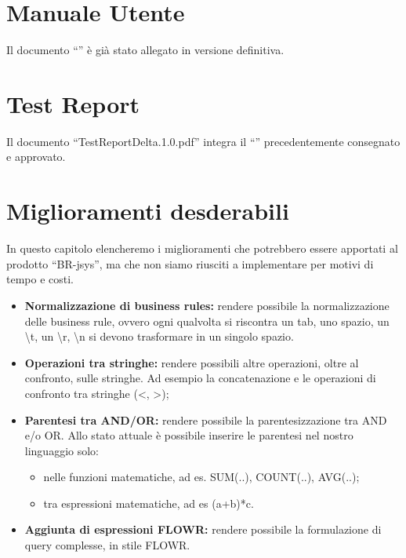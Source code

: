\chapter{Manuale Utente}
Il documento ``\MU'' \`e gi\`a stato allegato in versione definitiva.
\chapter{Test Report}
Il documento ``TestReportDelta.1.0.pdf'' integra il ``\TR'' precedentemente consegnato e approvato.
\chapter{Miglioramenti desderabili}
In questo capitolo elencheremo i miglioramenti che potrebbero essere apportati al prodotto ``BR-jsys'', ma che non siamo riusciti a implementare per motivi di tempo e costi. 
\begin{itemize}
\item \textbf{Normalizzazione di business rules:} rendere possibile la normalizzazione delle business rule, ovvero ogni qualvolta si riscontra un tab, uno spazio, un \textbackslash t, un \textbackslash r, \textbackslash n si devono trasformare in un singolo spazio. 
\item \textbf{Operazioni tra stringhe:} rendere possibili altre operazioni, oltre al confronto, sulle stringhe. Ad esempio la concatenazione e le operazioni di confronto tra stringhe (\textless, \textgreater); 
\item \textbf{Parentesi tra AND/OR:} rendere possibile la parentesizzazione tra AND e/o OR. Allo stato attuale \`e possibile inserire le parentesi nel nostro linguaggio solo:
\begin{itemize}
\item nelle funzioni matematiche, ad es. SUM(..), COUNT(..), AVG(..);
\item tra espressioni matematiche, ad es (a+b)*c.
\end{itemize}
\item \textbf{Aggiunta di espressioni FLOWR:} rendere possibile la formulazione di query complesse, in stile FLOWR.
\end{itemize}

